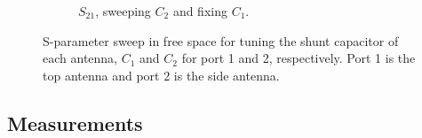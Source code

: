 \begin{figure}[htbp]
\begin{subfigure}[b]{0.49\linewidth}
        \caption{$S_{21}$, sweeping $C_2$ and fixing $C_1$.}
        \label{fig:ant1_proto_sim_s22}
    \end{subfigure}
    \caption{S-parameter sweep in free space for tuning the shunt capacitor of each antenna, $C_1$ and $C_2$ for port 1 and 2, respectively. Port 1 is the top antenna and port 2 is the side antenna.}
    \label{fig:sparam_mono_proto_sim}
\end{figure}



\FloatBarrier
\subsection{Measurements}

